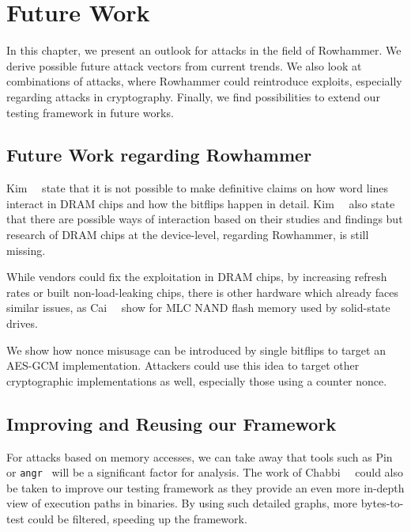\chapter{Future Work}\label{sec:futurework}

In this chapter, we present an outlook for attacks in the field of Rowhammer. We
derive possible future attack vectors from current trends. We also look at
combinations of attacks, where Rowhammer could reintroduce exploits, especially
regarding attacks in cryptography. Finally, we find possibilities to extend our
testing framework in future works.

\section{Future Work regarding Rowhammer}

Kim~\etal~\cite{rowhammergeneral} state that it is not possible to make
definitive claims on how word lines interact in DRAM chips and how the bitflips
happen in detail. Kim~\etal~\cite{rowhammergeneral} also state that there are
possible ways of interaction based on their studies and findings but research of
DRAM chips at the device-level, regarding Rowhammer, is still missing.

While vendors could fix the exploitation in DRAM chips, by increasing refresh
rates or built non-load-leaking chips, there is other hardware which already
faces similar issues, as Cai~\etal~\cite{rownandhammer} show for MLC NAND flash
memory used by solid-state drives.

We show how nonce misusage can be introduced by single bitflips to target an
AES-GCM implementation. Attackers could use this idea to target other
cryptographic implementations as well, especially those using a counter nonce.

\section{Improving and Reusing our Framework}

For attacks based on memory accesses, we can take away that tools such as
Pin~\cite{pintool} or \texttt{angr}~\cite{angrpaper} will be a significant
factor for analysis. The work of Chabbi~\etal~\cite{pincallpaths} could also be
taken to improve our testing framework as they provide an even more in-depth
view of execution paths in binaries. By using such detailed graphs, more
bytes-to-test could be filtered, speeding up the framework.

